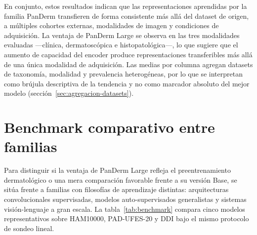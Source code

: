 En conjunto, estos resultados indican que las representaciones
aprendidas por la familia PanDerm transfieren de forma consistente más
allá del dataset de origen, a múltiples cohortes externas, modalidades
de imagen y condiciones de adquisición. La ventaja de PanDerm Large se
observa en las tres modalidades evaluadas ---clínica, dermatoscópica e
histopatológica---, lo que sugiere que el aumento de capacidad del
encoder produce representaciones transferibles más allá de una única
modalidad de adquisición. Las medias por columna agregan datasets de
taxonomía, modalidad y prevalencia heterogéneas, por lo que se
interpretan como brújula descriptiva de la tendencia y no como
marcador absoluto del mejor modelo
(sección~\ref{sec:agregacion-datasets}).

\section{Benchmark comparativo entre familias}
\label{sec:benchmark}

Para distinguir si la ventaja de PanDerm Large refleja el
preentrenamiento dermatológico o una mera comparación favorable
frente a su versión Base, se sitúa frente a familias con filosofías
de aprendizaje distintas: arquitecturas convolucionales supervisadas,
modelos auto-supervisados generalistas y sistemas visión-lenguaje a
gran escala. La tabla~\ref{tab:benchmark} compara cinco modelos
representativos sobre HAM10000, PAD-UFES-20 y DDI bajo el mismo
protocolo de sondeo lineal.

\begin{table}[H]
\centering
\footnotesize
\setlength{\tabcolsep}{4pt}
\renewcommand{\arraystretch}{0.95}
\caption{Benchmark comparativo bajo sondeo lineal sobre HAM10000,
PAD-UFES-20 y DDI. Mejor valor por columna en negrita.}
\label{tab:benchmark}
\end{table}

